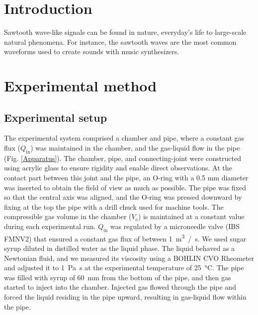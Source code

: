 \documentclass[aps,pre,preprint,groupedaddress,showkeys]{revtex4-2}
\begin{document}

\maketitle

\section{Introduction}\label{intro}
Sawtooth wave-like signals can be found in nature, everyday's life to large-scale natural phenomena. 
For instance, the sawtooth waves are the most common waveforms used to create sounds with music synthesizers.


\section{Experimental method}\label{met}
\subsection{Experimental setup}\label{setup}
The experimental system comprised a chamber and pipe, where a constant gas flux ($Q_\mathrm{in}$) was maintained in the chamber, and the gas-liquid flow in the pipe (Fig. \ref{Apparatus}). 
The chamber, pipe, and connecting-joint were constructed using acrylic glass to ensure rigidity and enable direct observations.
At the contact part between this joint and the pipe, an O-ring with a 0.5 mm diameter was inserted to obtain the field of view as much as possible.
The pipe was fixed so that the central axis was aligned, and the O-ring was pressed downward by fixing at the top the pipe with a drill chuck used for machine tools.
The compressible gas volume in the chamber ($V_\mathrm{c}$) is maintained at a constant value during each experimental run.
$Q_\mathrm{in}$ was regulated by a microneedle valve (IBS FMNV2) that ensured a constant gas flux of between \SI{1}{\m^3 /s}. 
We used sugar syrup diluted in distilled water as the liquid phase. 
The liquid behaved as a Newtonian fluid, and we measured its viscosity using a BOHLIN CVO Rheometer and adjusted it to \SI{1}{\Pa \s} at the experimental temperature of \SI{25}{\degreeCelsius}.
The pipe was filled with syrup of \SI{60}{mm} from the bottom of the pipe, and then gas started to inject into the chamber.
Injected gas flowed through the pipe and forced the liquid residing in the pipe upward, resulting in gas-liquid flow within the pipe.
\end{document}
